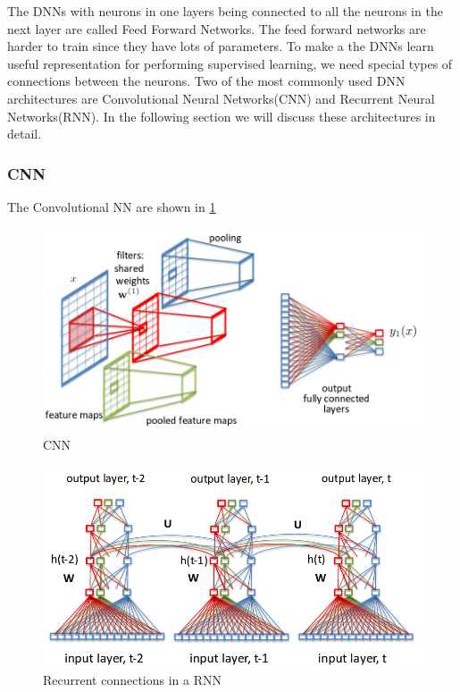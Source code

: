\documentclass[a4paper]{article}
\begin{document}
The DNNs  with neurons in one  layers being connected to all the neurons  in the
next  layer  are  called  Feed Forward Networks. The feed  forward networks  are
harder  to train since  they have lots  of parameters. To make  a the DNNs learn
useful representation for performing supervised learning,  we need special types
of  connections  between  the  neurons.  Two  of  the  most  commonly  used  DNN
architectures  are  Convolutional  Neural  Networks(CNN)  and  Recurrent  Neural
Networks(RNN). In the following section  we  will discuss these architectures in
detail.


\subsubsection{CNN}
The Convolutional NN are shown in \ref{fig:cnn}


\begin{figure}
  \includegraphics[width=.99\linewidth]{img/cnn.png}
  \caption{CNN}
  \label{fig:cnn}
\end{figure}


\begin{figure}
  \includegraphics[width=.99\linewidth]{img/rnn.png}
  \caption{Recurrent connections in a RNN}
  \label{fig:rnn}
\end{figure}
\end{document}
